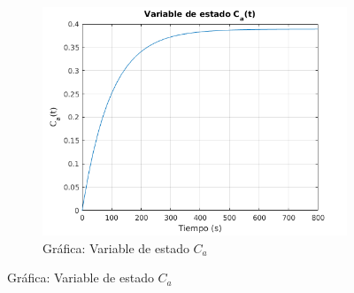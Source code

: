 \documentclass[12pt,letterpaper]{article}
\begin{document}
\begin{figure}
  \centering
  \begin{subfigure}[b]{0.45\textwidth}
	\includegraphics[width=\textwidth]{pictures/Ejercicio4/var_estado_Ca}
	\caption{Gráfica: Variable de estado $C_a$}
	\label{fig:var_estado_Ca}
  \end{subfigure} 


\end{figure}
\end{document}
